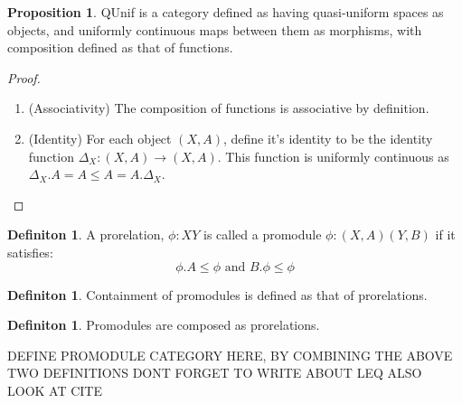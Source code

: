 \documentclass[18pt,a4paper]{article}
\makeatletter
\theoremstyle{definition}
\newtheorem{definition}[theorem]{Definiton}
\newtheorem{proop}[theorem]{Proposition}
\newcommand{\carrow}{}%
\DeclareRobustCommand{\carrow}{%
	\mathrel{\vphantom{\rightarrow}\mathpalette\circle@arrow\relax}%
}
\newcommand{\circle@arrow}[2]{%
	\m@th
	\ooalign{%
		\hidewidth$#1\circ\mkern1mu$\hidewidth\cr
	$#1\longrightarrow$\cr}%
}
\makeatother
\begin{document}
		\begin{proop} QUnif is a category defined as having quasi-uniform spaces as objects,
			and uniformly continuous maps between them as morphisms, with composition defined as that of functions.
		\end{proop}
		\begin{proof}\setcounter{equation}{0}

			\begin{enumerate}[label=(\roman*)]
				\item (Associativity) The composition of functions is associative by definition.
				\item (Identity) For each object $(X,A)$, define it's identity to be the identity
					function $\Delta_X:(X,A) \to (X,A)$.
					This function is uniformly continuous as $\Delta_X.A=A \leq A=A.\Delta_X$.
					\qedhere
			\end{enumerate}
		\end{proof}
		\begin{definition}%
			A prorelation, $\phi:X \carrow Y$ is called a promodule $\phi: (X,A) \carrow (Y,B)$  if it
			satisfies:
			\[ \phi.A \leq \phi \text{ and } B. \phi \leq \phi \]
		\end{definition}
		\begin{definition} %
			Containment of promodules is defined as that of prorelations.
		\end{definition}
		\begin{definition} %
			Promodules are composed as prorelations.\\
		\end{definition}

		DEFINE PROMODULE CATEGORY HERE, BY COMBINING THE ABOVE TWO DEFINITIONS DONT FORGET TO WRITE ABOUT LEQ
		ALSO LOOK AT CITE
\end{document}
